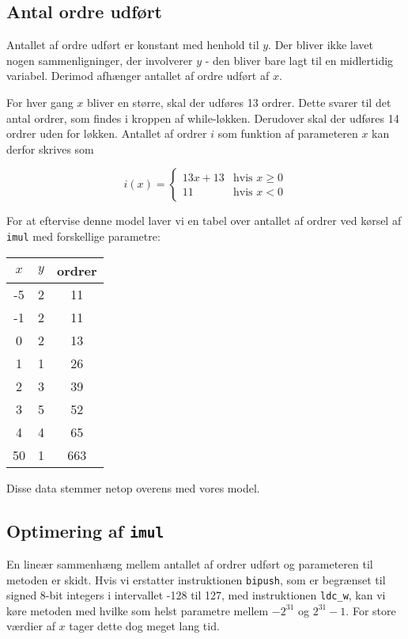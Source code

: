 \documentclass[12pt,a4paper]{article}
\newcommand{\imul}{\texttt{imul}}
\begin{document}
\subsection{Antal ordre udført}
Antallet af ordre udført er konstant med henhold til $y$. Der bliver ikke lavet
nogen sammenligninger, der involverer $y$ - den bliver bare lagt til en
midlertidig variabel. Derimod afhænger antallet af ordre udført af $x$.

For hver gang $x$ bliver en større, skal der udføres 13 ordrer. Dette
svarer til det antal ordrer, som findes i kroppen af while-løkken.
Derudover skal der udføres 14 ordrer uden for løkken.
Antallet af ordrer $i$ som funktion af parameteren $x$ kan derfor
skrives som

\[i(x)=\left\{\begin{array}{cc}
	13x + 13 & \text{hvis }x\geq0 \\
	11 & \text{hvis }x<0
\end{array}\right.\]


For at eftervise denne model laver vi en tabel over antallet af ordrer
ved kørsel af \imul{} med forskellige parametre:

\begin{tabular}{|c|c|c|}
\hline
$x$ & $y$ & ordrer \\ \hline
-5  & 2  &  11 \\ \hline
-1  & 2  &  11 \\ \hline
 0  & 2  &  13 \\ \hline
 1  & 1  &  26 \\ \hline
 2  & 3  &  39 \\ \hline
 3  & 5  &  52 \\ \hline
 4  & 4  &  65 \\ \hline
50  & 1  & 663 \\ \hline
\end{tabular}

Disse data stemmer netop overens med vores model.

\subsection{Optimering af \imul{}}

En lineær sammenhæng mellem antallet af ordrer udført og parameteren til
metoden er skidt. Hvis vi erstatter instruktionen \texttt{bipush}, som er
begrænset til signed 8-bit integers i intervallet -128 til 127, med
instruktionen \texttt{ldc\_w}, kan vi køre metoden med hvilke som helst
parametre mellem $-2^{31}$ og $2^{31}-1$. For store værdier af $x$ tager dette
dog meget lang tid.
\end{document}
